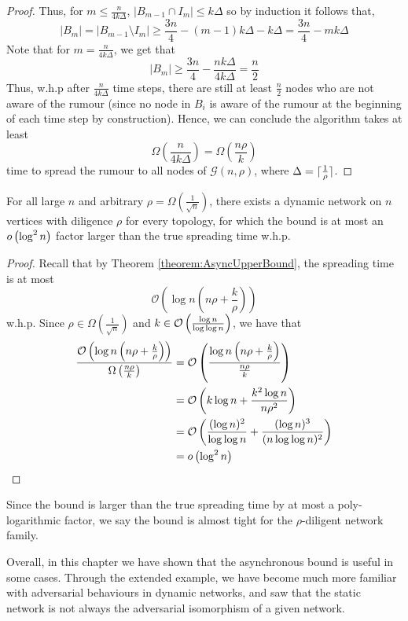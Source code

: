 \begin{proof}
	Thus, for $m \leq \frac{n}{4k\Delta}$, $|B_{m-1} \cap I_m| \leq k\Delta$ so by induction it follows that,
	$$
		|B_m| = |B_{m-1} \setminus I_m| \geq \frac{3n}{4} - (m-1)k\Delta - k\Delta = \frac{3n}{4} - mk\Delta
	$$
	Note that for $m = \frac{n}{4k\Delta}$, we get that 
	$$
		|B_m| \geq \frac{3n}{4} - \frac{nk\Delta}{4k\Delta} = \frac{n}{2}
	$$
	Thus, w.h.p after $\frac{n}{4k\Delta}$ time steps, there are still at least $\frac{n}{2}$ nodes who are not aware of the rumour (since no node in $B_i$ is aware of the rumour at the beginning of each time step by construction). Hence, we can conclude the algorithm takes at least 
	$$
		\Omega\left(\frac{n}{4k\Delta}\right) = \Omega\left(\frac{n\rho}{k}\right)
	$$
	time to spread the rumour to all nodes of $\mathcal{G}(n, \rho)$, where $\Delta = \lceil\frac{1}{\rho}\rceil$.
\end{proof}

\begin{corollary}
	For all large $n$ and arbitrary $\rho = \Omega\left(\frac{1}{\sqrt{n}}\right)$, there exists a dynamic network on $n$ vertices with diligence $\rho$ for every topology, for which the bound is at most an $o\left( \log^2 n \right)$ factor larger than the true spreading time w.h.p.
\end{corollary}

\begin{proof}
	Recall that by Theorem \ref{theorem:AsyncUpperBound}, the spreading time is at most
	$$
		\mathcal{O}\left(\log n \left(n \rho + \frac{k}{\rho}\right)\right)
	$$
	w.h.p.
	Since $\rho \in \Omega\left(\frac{1}{\sqrt{n}}\right)$ and  $k \in \mathcal{O} \left( \frac{\log n}{\log \log n} \right)$, we have that
	\begin{align*}
		\frac{\mathcal{O} \left( \log n \left( n \rho + \frac{k}{\rho} \right) \right)}{\Omega \left( \frac{n\rho}{k} \right)} 
		&= \mathcal{O} \left( \frac{\log n \left( n \rho + \frac{k}{\rho} \right)}{\frac{n\rho}{k}} \right) \\
		&= \mathcal{O} \left( k \log n + \frac{k^2 \log n}{n \rho^2} \right) \\
		&= \mathcal{O} \left( \frac{(\log n)^2}{\log \log n}  + \frac{(\log n)^3}{(n \log \log n)^2} \right) \\
		&= o\left( \log^2 n \right)
	\end{align*}
	
\end{proof}

Since the bound is larger than the true spreading time by at most a poly-logarithmic factor, we say the bound is almost tight for the $\rho$-diligent network family. 

Overall, in this chapter we have shown that the asynchronous bound is useful in some cases. Through the extended example, we have become much more familiar with adversarial behaviours in dynamic networks, and saw that the static network is not always the adversarial isomorphism of a given network.